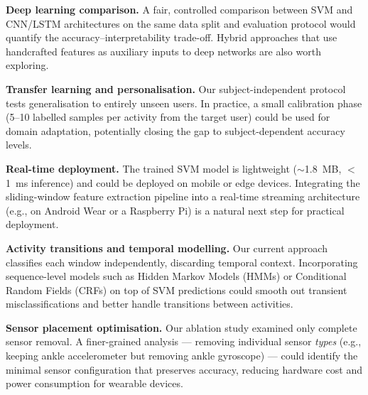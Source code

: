 \documentclass[10pt,twocolumn,letterpaper]{article}
\begin{document}
\textbf{Deep learning comparison.} A fair, controlled comparison between SVM and CNN/LSTM architectures on the same data split and evaluation protocol would quantify the accuracy--interpretability trade-off. Hybrid approaches that use handcrafted features as auxiliary inputs to deep networks are also worth exploring.

\textbf{Transfer learning and personalisation.} Our subject-independent protocol tests generalisation to entirely unseen users. In practice, a small calibration phase (5--10 labelled samples per activity from the target user) could be used for domain adaptation, potentially closing the gap to subject-dependent accuracy levels.

\textbf{Real-time deployment.} The trained SVM model is lightweight ($\sim$1.8~MB, $<$1~ms inference) and could be deployed on mobile or edge devices. Integrating the sliding-window feature extraction pipeline into a real-time streaming architecture (e.g., on Android Wear or a Raspberry Pi) is a natural next step for practical deployment.

\textbf{Activity transitions and temporal modelling.} Our current approach classifies each window independently, discarding temporal context. Incorporating sequence-level models such as Hidden Markov Models (HMMs) or Conditional Random Fields (CRFs) on top of SVM predictions could smooth out transient misclassifications and better handle transitions between activities.

\textbf{Sensor placement optimisation.} Our ablation study examined only complete sensor removal. A finer-grained analysis --- removing individual sensor \textit{types} (e.g., keeping ankle accelerometer but removing ankle gyroscope) --- could identify the minimal sensor configuration that preserves accuracy, reducing hardware cost and power consumption for wearable devices.
\end{document}
